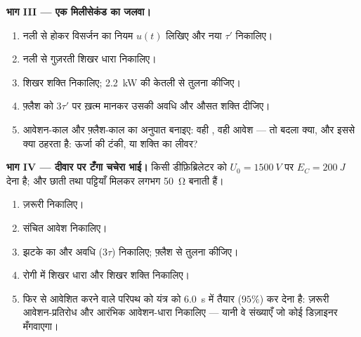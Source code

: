 \begin{problem}
\medskip
\noindent\textbf{भाग III --- एक मिलीसेकंड का जलवा।}
\begin{enumerate}[resume]
  \item नली से होकर विसर्जन का नियम $u(t)$ लिखिए और नया 
        $\tau'$ निकालिए।
  \item नली से गुज़रती शिखर धारा निकालिए।
  \item शिखर शक्ति निकालिए; \qty{2.2}{kW} की केतली से तुलना कीजिए।
  \item फ़्लैश को $3\tau'$ पर ख़त्म मानकर उसकी अवधि और औसत शक्ति दीजिए।
  \item आवेशन-काल और फ़्लैश-काल का अनुपात बनाइए: वही , वही
        आवेश --- तो बदला क्या, और इससे  क्या ठहरता है:
        ऊर्जा की टंकी, या शक्ति का लीवर?
\end{enumerate}

\medskip
\noindent\textbf{भाग IV --- दीवार पर टँगा चचेरा भाई।}
किसी डीफ़िब्रिलेटर को $U_0 = \qty{1500}{V}$ पर $E_C = \qty{200}{J}$ देना है; और छाती तथा पट्टियाँ मिलकर
लगभग \qty{50}{\ohm} बनाती हैं।
\begin{enumerate}[resume]
  \item ज़रूरी  निकालिए।
  \item संचित आवेश निकालिए।
  \item झटके का  और अवधि ($3\tau$) निकालिए; फ़्लैश से तुलना
        कीजिए।
  \item रोगी में शिखर धारा और शिखर शक्ति निकालिए।
  \item फिर से आवेशित करने वाले परिपथ को यंत्र को \qty{6.0}{s} में तैयार ($95\%$)
        कर देना है: ज़रूरी आवेशन-प्रतिरोध और आरंभिक आवेशन-धारा
        निकालिए --- यानी वे संख्याएँ जो कोई डिज़ाइनर मँगवाएगा।
\end{enumerate}
\end{problem}
